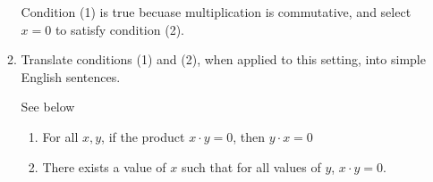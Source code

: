 \documentclass[10pt]{article}
\begin{document}
\begin{enumerate}[label=\alph*)]
\begin{enumerate}[label=\roman*)]
					\begin{solution}
						Condition (1) is true becuase multiplication is commutative,
						and select \( x = 0 \) to satisfy condition (2). 
					\end{solution}
				\item Translate conditions (1) and (2), when applied to this 
					setting, into simple English sentences. 

					\begin{solution}
						See below
						\begin{enumerate}[label=\arabic*.]
							\item For all \( x, y \), if the product 
								\( x \cdot y = 0 \), then \( y \cdot x = 0 \)
							\item There exists a value of \( x \) such that 
								for all values of \( y \), \( x \cdot y = 0 \). 
						\end{enumerate}
					\end{solution}
			\end{enumerate}
	\end{enumerate}
	\pagebreak
\end{document}
